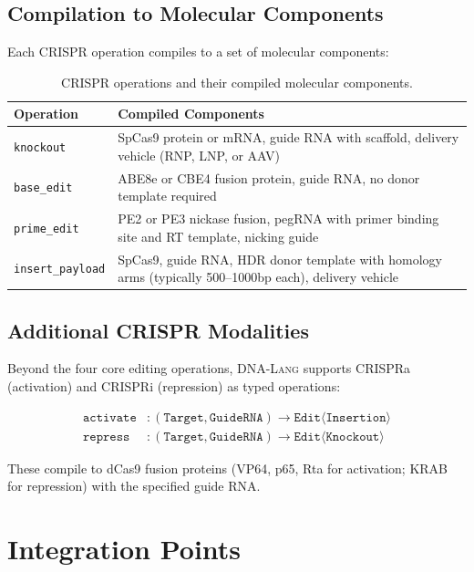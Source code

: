 \documentclass[12pt,a4paper]{article}
\newcommand{\DNALang}{\textsc{DNA-Lang}}
\newcommand{\ty}[1]{\texttt{#1}}
\begin{document}
\subsection{Compilation to Molecular Components}

Each CRISPR operation compiles to a set of molecular components:

\begin{table}[H]
\centering
\caption{CRISPR operations and their compiled molecular components.}
\label{tab:crispr-compilation}
\begin{tabular}{lp{9cm}}
\toprule
\textbf{Operation} & \textbf{Compiled Components} \\
\midrule
\texttt{knockout} & SpCas9 protein or mRNA, guide RNA with scaffold, delivery vehicle (RNP, LNP, or AAV) \\
\texttt{base\_edit} & ABE8e or CBE4 fusion protein, guide RNA, no donor template required \\
\texttt{prime\_edit} & PE2 or PE3 nickase fusion, pegRNA with primer binding site and RT template, nicking guide \\
\texttt{insert\_payload} & SpCas9, guide RNA, HDR donor template with homology arms (typically 500--1000bp each), delivery vehicle \\
\bottomrule
\end{tabular}
\end{table}

\subsection{Additional CRISPR Modalities}

Beyond the four core editing operations, \DNALang{} supports CRISPRa (activation) and CRISPRi (repression) as typed operations:

\begin{align*}
\texttt{activate} &: (\ty{Target}, \ty{GuideRNA}) \to \ty{Edit}\langle\ty{Insertion}\rangle \\
\texttt{repress} &: (\ty{Target}, \ty{GuideRNA}) \to \ty{Edit}\langle\ty{Knockout}\rangle
\end{align*}

These compile to dCas9 fusion proteins (VP64, p65, Rta for activation; KRAB for repression) with the specified guide RNA.


\section{Integration Points}
\label{sec:integration}
\end{document}
